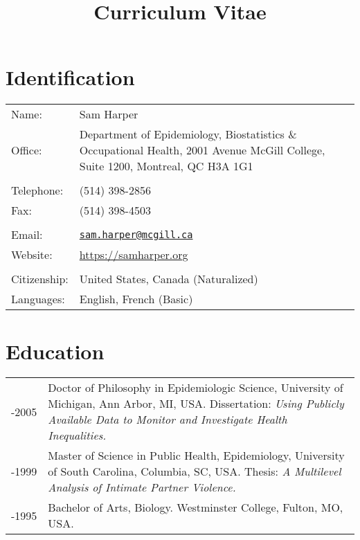 \documentclass[
  letterpaper,
  DIV=11,
  numbers=noendperiod]{scrartcl}
\title{Curriculum Vitae}
\author{}
\date{}
\begin{document}
\maketitle


\section{Identification}\label{identification}

\begin{longtable}[]{@{}
  >{\raggedright\arraybackslash}p{}
  >{\raggedright\arraybackslash}p{}@{}}
\toprule\noalign{}
\endhead
\bottomrule\noalign{}
\endlastfoot
Name: & Sam Harper \\
Office: & Department of Epidemiology, Biostatistics \& Occupational
Health, 2001 Avenue McGill College, Suite 1200, Montreal, QC H3A 1G1 \\
& \\
Telephone: & (514) 398-2856 \\
Fax: & (514) 398-4503 \\
& \\
Email: &
\href{mailto:sam.harper@mcgill.ca}{\nolinkurl{sam.harper@mcgill.ca}} \\
Website: & \url{https://samharper.org} \\
& \\
Citizenship: & United States, Canada (Naturalized) \\
Languages: & English, French (Basic) \\
\end{longtable}

\section{Education}\label{education}

\begin{longtable}[]{@{}
  >{\raggedright\arraybackslash}p{}
  >{\raggedright\arraybackslash}p{}@{}}
\toprule\noalign{}
\endhead
\bottomrule\noalign{}
\endlastfoot
2001-2005 & Doctor of Philosophy in Epidemiologic Science, University of
Michigan, Ann Arbor, MI, USA. Dissertation: \emph{Using Publicly
Available Data to Monitor and Investigate Health Inequalities.} \\
1997-1999 & Master of Science in Public Health, Epidemiology, University
of South Carolina, Columbia, SC, USA. Thesis: \emph{A Multilevel
Analysis of Intimate Partner Violence.} \\
1991-1995 & Bachelor of Arts, Biology. Westminster College, Fulton, MO,
USA. \\
\end{longtable}
\end{document}
